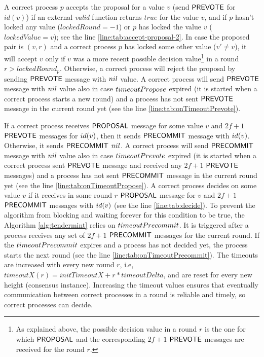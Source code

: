 A correct process $p$ accepts the proposal for a value $v$  (send $\mathsf{PREVOTE}$
for $id(v)$) if an external \emph{valid} function returns $true$ for the value
$v$, and if $p$ hasn't locked any value ($lockedRound = -1$) or $p$ has locked
the value $v$ ($lockedValue = v$); see the line
\ref{line:tab:accept-proposal-2}.  In case the proposed pair is $(v,r)$ and a
correct process $p$ has locked some other value ($v' \neq v$), it will accept
$v$ only if $v$ was a more recent possible decision value\footnote{As
explained above, the possible decision value in a round $r$ is the one for
which $\mathsf{PROPOSAL}$ and the corresponding $2f+1$ $\mathsf{PREVOTE}$ messages are received
for the round $r$.} in a round $r > lockedRound_p$.  Otherwise, a correct
process will reject the proposal by sending $\mathsf{PREVOTE}$ message with $nil$
value. A correct process will send $\mathsf{PREVOTE}$ message with $nil$ value also in
case $timeoutPropose$ expired (it is started when a correct process starts a
new round) and a process has not sent $\mathsf{PREVOTE}$ message in the current round
yet (see the line \ref{line:tab:onTimeoutPrevote}). 

If a correct process receives $\mathsf{PROPOSAL}$ message for some value $v$ and $2f+1$
$\mathsf{PREVOTE}$ messages for $id(v)$, then it sends $\mathsf{PRECOMMIT}$ message with
$id(v)$. Otherwise, it sends $\mathsf{PRECOMMIT}$ $nil$. A correct process will send
$\mathsf{PRECOMMIT}$ message with $nil$ value also in case $timeoutPrevote$ expired
(it is started when a correct process sent $\mathsf{PREVOTE}$ message and received any
$2f+1$ $\mathsf{PREVOTE}$ messages)  and a process has not sent $\mathsf{PRECOMMIT}$ message in
the current round yet (see the line \ref{line:tab:onTimeoutPropose}).  A
correct process decides on some value $v$ if it receives in some round $r$
$\mathsf{PROPOSAL}$ message for $v$ and $2f+1$ $\mathsf{PRECOMMIT}$ messages with $id(v)$ (see
the line \ref{line:tab:decide}).  To prevent the algorithm from blocking and
waiting forever for this condition to be true, the Algorithm
\ref{alg:tendermint} relies on $timeoutPrecommit$. It is triggered after a
process receives any set of $2f+1$ $\mathsf{PRECOMMIT}$ messages for the current round.
If the $timeoutPrecommit$ expires and a process has not decided yet, the
process starts the next round (see the line \ref{line:tab:onTimeoutPrecommit}).
The timeouts are increased with every new round $r$, i.e, $timeoutX(r) =
initTimeoutX + r*timeoutDelta$, and are reset for every new height (consensus
instance). Increasing the timeout values ensures that eventually communication
between correct processes in a round is reliable and timely, so correct
processes can decide. 

